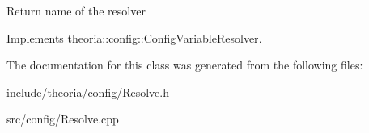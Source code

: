 Return name of the resolver 

Implements \hyperlink{classtheoria_1_1config_1_1ConfigVariableResolver_a026bda729faf988eaef334a45ec92303}{theoria\+::config\+::\+Config\+Variable\+Resolver}.



The documentation for this class was generated from the following files\+:\begin{DoxyCompactItemize}
\item 
include/theoria/config/Resolve.\+h\item 
src/config/Resolve.\+cpp\end{DoxyCompactItemize}
